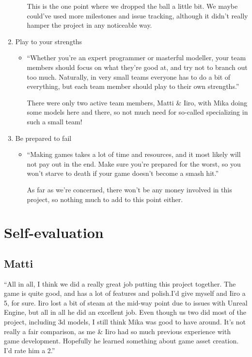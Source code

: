 \documentclass[
  oneside,
  11pt, a4paper,
  footinclude=true,
  headinclude=true,
  cleardoublepage=empty
]{scrbook}
\begin{document}
\begin{enumerate}
\begin{itemize}
    \medskip
    This is the one point where we dropped the ball a little bit. We maybe could've used more milestones and issue tracking, although it didn't really hamper the project in any noticeable way.
    \end{itemize}
\item Play to your strengths
    \begin{itemize}
    \item ``Whether you're an expert programmer or masterful modeller, your team members should focus on what they're good at, and try not to branch out too much. Naturally, in very small teams everyone has to do a bit of everything, but each team member should play to their own strengths.''
    
    \medskip
    There were only two active team members, Matti \& Iiro, with Mika doing some models here and there, so not much need for so-called specializing in such a small team!
    \end{itemize}
\item  Be prepared to fail 
    \begin{itemize}
    \item ``Making games takes a lot of time and resources, and it most likely will not pay out in the end. Make sure you're prepared for the worst, so you won't starve to death if your game doesn't become a smash hit.''
    
    \medskip
    As far as we're concerned, there won't be any money involved in this project, so nothing much to add to this point either.
    \end{itemize}
\end{enumerate}


\chapter{Self-evaluation}
\section{Matti}
``All in all, I think we did a really great job putting this project together. The game is quite good, and has a lot of features and polish.I'd give myself and Iiro a 5, for sure. Iiro lost a bit of steam at the mid-way point due to issues with Unreal Engine, but all in all he did an excellent job. Even though us two did most of the project, including 3d models, I still think Mika was good to have around. It's not really a fair comparison, as me \& Iiro had so much previous experience with game development. Hopefully he learned something about game asset creation. I'd rate him a 2.''
\end{document}
